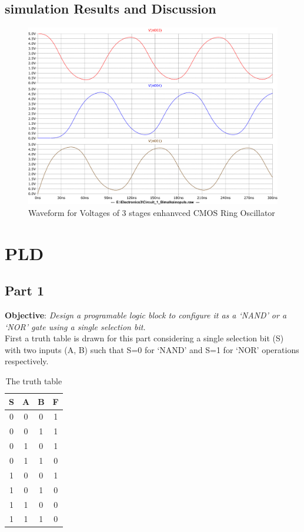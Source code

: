 \documentclass[a4paper,11pt]{article}%
\begin{document}
\subsection{simulation Results and Discussion}

\begin{figure}[H]
	\centering
	\includegraphics[scale=0.5]{figures/cct1plot1}
	\caption{Waveform for Voltages of 3 stages enhanvced CMOS Ring Oscillator}
\end{figure}


\pagebreak
\section{PLD}
\subsection{Part 1}
\textbf{Objective}: \textit{Design a programable logic block to configure it as a `NAND' or a `NOR' gate using a single selection bit.}\\

First a truth table is drawn for this part considering a single selection bit (S) with two inputs (A, B) such that S=0 for ‘NAND’ and S=1 for ‘NOR’ operations respectively.
\begin{table}[H]
	\centering
	\begin{tabular}{|c |c| c| c|}
		\hline
		S & A & B & F \\\hline
		0 & 0 & 0 & 1 \\
		0 & 0 & 1 & 1 \\
		0 & 1 & 0 & 1 \\
		0 & 1 & 1 & 0 \\\hline
		1 & 0 & 0 & 1 \\
		1 & 0 & 1 & 0 \\
		1 & 1 & 0 & 0 \\
		1 & 1 & 1 & 0 \\\hline\hline
	\end{tabular}
\caption{The truth table}
\end{table}
\end{document}
